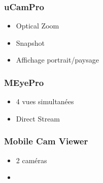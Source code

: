 \subsubsection{uCamPro}
\begin{itemize}
  \item Optical Zoom
  \item Snapshot
  \item Affichage portrait/paysage
\end{itemize}

\subsubsection{MEyePro}
\begin{itemize}
  \item 4 vues simultanées
  \item Direct Stream
\end{itemize}


\subsubsection{Mobile Cam Viewer}
\begin{itemize}
  \item 2 caméras
  \item
\end{itemize}
\clearpage